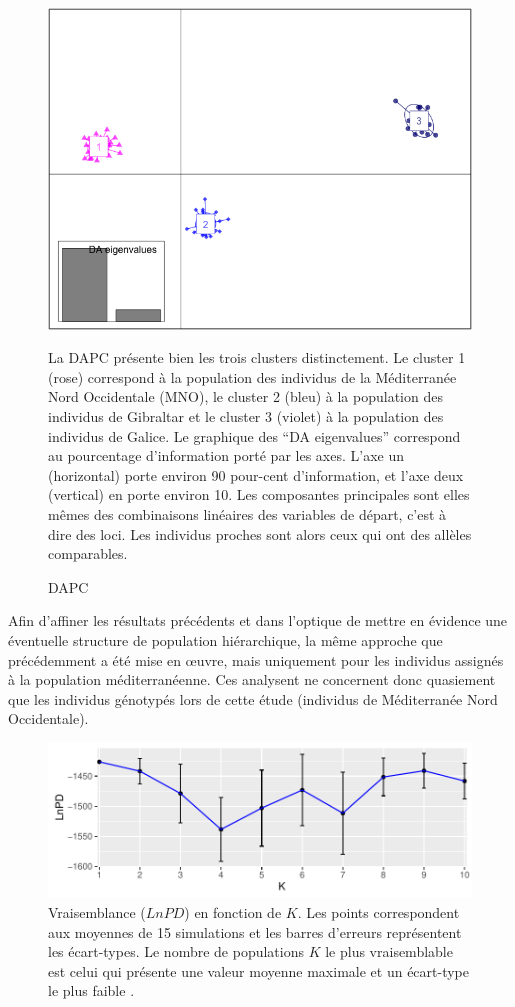 \documentclass[a4paper,12pt,twoside]{article}\usepackage[]{graphicx}\usepackage[]{color}
\makeatletter
\def\maxwidth{ %
  \ifdim\Gin@nat@width>\linewidth
    \linewidth
  \else
    \Gin@nat@width
  \fi
}
\makeatother
\begin{document}
\begin{figure}[htbp]
	\centering
		\includegraphics[width=.7\textwidth]{DAPC}
	\caption{DAPC}La DAPC présente bien les trois clusters distinctement. Le cluster 1 (rose) correspond à la population des individus de la Méditerranée Nord Occidentale (MNO), le cluster 2 (bleu) à la population des individus de Gibraltar et le cluster 3 (violet) à la population des individus de Galice. Le graphique des ``DA eigenvalues'' correspond au pourcentage d'information porté par les axes. L'axe un (horizontal) porte environ 90 pour-cent d'information, et l'axe deux (vertical) en porte environ 10. Les composantes principales sont elles mêmes des combinaisons linéaires des variables de départ, c'est à dire des loci. Les individus proches sont alors ceux qui ont des allèles comparables.
	\label{fig:DAPC}
\end{figure}


Afin d'affiner les résultats précédents et dans l'optique de mettre en évidence une éventuelle structure de population hiérarchique, la même approche que précédemment a été mise en \oe uvre, mais uniquement pour les individus assignés à la population méditerranéenne. Ces analysent ne concernent donc quasiement que les individus génotypés lors de cette étude (individus de Méditerranée Nord Occidentale).

\begin{figure}[htpb]

{\centering \includegraphics[width=\maxwidth]{figure/lnpd2-1} 

}

\caption[Vraisemblance ($LnPD$) en fonction de $K$.]{Vraisemblance ($LnPD$) en fonction de $K$. Les points correspondent aux moyennes de 15 simulations et les barres d'erreurs représentent les écart-types. Le nombre de populations $K$ le plus vraisemblable est celui qui présente une valeur moyenne maximale et un écart-type le plus faible \citep{pritchard2000}.}\label{fig:lnpd2}
\end{figure}
\end{document}
